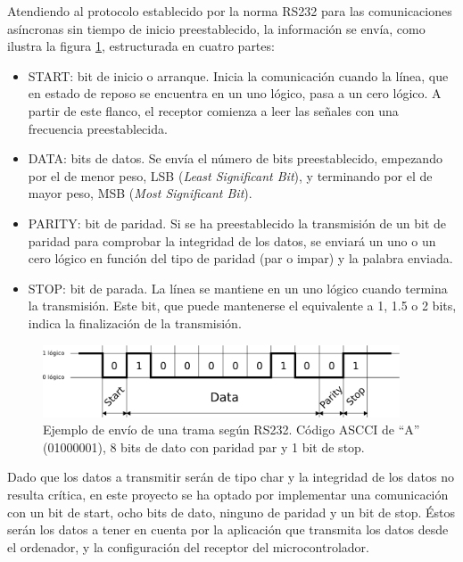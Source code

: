 Atendiendo al protocolo establecido por la norma RS232 para las comunicaciones asíncronas sin tiempo de inicio preestablecido, la información se envía, como ilustra la figura \ref{fig:trama_rs232}, estructurada en cuatro partes:

\begin{itemize}
	\item{START: bit de inicio o arranque. Inicia la comunicación cuando la línea, que en estado de reposo se encuentra en un uno lógico, pasa a un cero lógico. A partir de este flanco, el receptor comienza a leer las señales con una frecuencia preestablecida.}
	\item{DATA: bits de datos. Se envía el número de bits preestablecido, empezando por el de menor peso, LSB (\textit{Least Significant Bit}), y terminando por el de mayor peso, MSB (\textit{Most Significant Bit}).}
	\item{PARITY: bit de paridad. Si se ha preestablecido la transmisión de un bit de paridad para comprobar la integridad de los datos, se enviará un uno o un cero lógico en función del tipo de paridad (par o impar) y la palabra enviada.}
	\item{STOP: bit de parada. La línea se mantiene en un uno lógico cuando termina la transmisión. Este bit, que puede mantenerse el equivalente a 1, 1.5 o 2 bits, indica la finalización de la transmisión.}
\end{itemize}

\begin{figure}[!htp]
\centering
\includegraphics[width=300pt]{./images/trama_rs232.png}
\caption[Ejemplo de envío de una trama según RS232]{Ejemplo de envío de una trama según RS232. Código ASCCI de ``A'' (01000001), 8 bits de dato con paridad par y 1 bit de stop.}
\label{fig:trama_rs232}
\end{figure}

Dado que los datos a transmitir serán de tipo char y la integridad de los datos no resulta crítica, en este proyecto se ha optado por implementar una comunicación con un bit de start, ocho bits de dato, ninguno de paridad y un bit de stop. Éstos serán los datos a tener en cuenta por la aplicación que transmita los datos desde el ordenador, y la configuración del receptor del microcontrolador.

